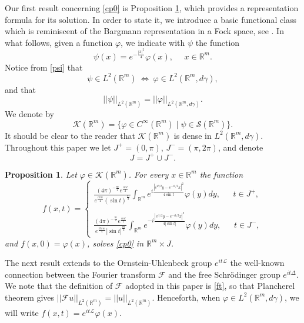 \documentclass[11pt,a4paper]{amsart}
\def \vf{\varphi}
\newcommand{\Rm}{\mathbb R^m}
\numberwithin{equation}{section}
\newtheorem{proposition}[theorem]{Proposition}
\numberwithin{equation}{section}
\begin{document}
Our first result concerning \eqref{cp0} is Proposition \ref{P:OUim}, which provides a representation formula for its solution. In order to state it, we introduce a basic functional class which is reminiscent of the Bargmann representation in a Fock space, see \cite[Chap. 1 \& 5]{Fo}. In what follows, given a function $\vf$, we indicate with $\psi$ the function
\begin{equation}\label{psi}
\psi(x) = e^{- \frac{|x|^2}{4}} \vf(x),\ \ \ \ \ \ x\in \Rm.
\end{equation} 
Notice from \eqref{psi} that 
\[
\psi\in L^2(\Rm)\ \Longleftrightarrow\ \vf\in L^2(\Rm,d\gamma),
\]
and that
\begin{equation}\label{phipsi}
||\psi||_{L^2(\Rm)} = ||\vf||_{L^2(\Rm,d\gamma)}.
\end{equation}
We denote by 
\begin{equation}\label{K}
\mathscr K(\Rm) = \{\vf\in C^\infty(\Rm)\mid \psi \in \mathscr S(\Rm)\}.
\end{equation}
It should be clear to the reader that $\mathscr K(\Rm)$ is dense in $L^2(\Rm,d\gamma)$. Throughout this paper we let $J^+ = (0,\pi)$, $J^- = (\pi,2\pi)$, and denote 
\[
J = J^+\cup J^-. 
\]


\begin{proposition}\label{P:OUim}
Let $\vf\in \mathscr K(\Rm)$. For every $x\in \Rm$ the function  
\begin{equation}\label{OUim}
f(x,t) = \begin{cases}
\frac{(4\pi
)^{-\frac{m}{2}} e^{\frac{imt}2}}{e^{\frac{i\pi m}{4}} (\sin t)^{\frac m2}} \int_{\Rm} e^{i \frac{|e^{it/2} y-e^{-it/2} x|^2}{4 \sin t}} \vf(y) dy,\ \ \ \ \ \ \ t\in J^+,
\\
\\
\frac{(4\pi
)^{-\frac{m}{2}} e^{\frac{imt}2}}{e^{\frac{i 3\pi m}{4}} |\sin t|^{\frac m2}} \int_{\Rm} e^{-i \frac{|e^{it/2} y-e^{-it/2} x|^2}{4 |\sin t|}} \vf(y) dy,\ \ \ \ \ \ \ t\in J^-,
\end{cases}
\end{equation} 
and $f(x,0) = \vf(x)$, solves \eqref{cp0} in $\Rm\times J$.
\end{proposition}



The next result extends to the Ornstein-Uhlenbeck group $e^{it\mathscr L}$ the well-known connection between the Fourier transform $\mathscr F$ and the free Schr\"odinger group $e^{it\Delta}$. We note that the definition of $\mathscr F$ adopted in this paper is \eqref{ft}, 
so that Plancherel theorem gives $||\mathscr F u||_{L^2(\Rm)} = ||u||_{L^2(\Rm)}$.
Henceforth, when $\vf\in L^2(\Rm,d\gamma)$, we will write $f(x,t) = e^{it\mathscr L}\vf(x)$.
\end{document}

